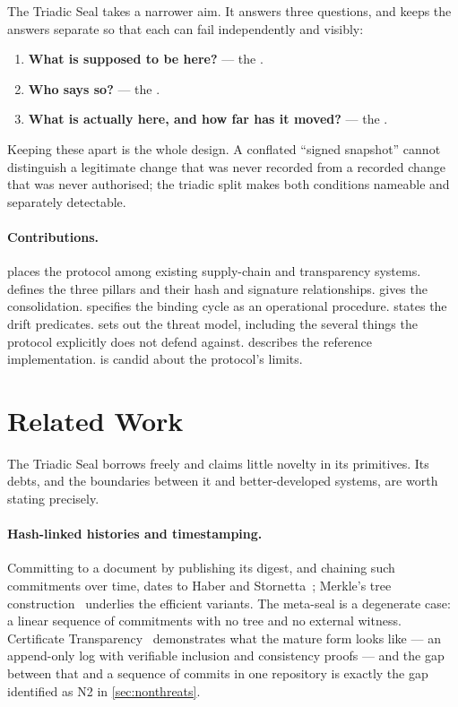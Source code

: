 \documentclass[11pt,a4paper]{article}
\begin{document}
The Triadic Seal takes a narrower aim. It answers three questions, and keeps
the answers separate so that each can fail independently and visibly:

\begin{enumerate}[label=(\roman*),leftmargin=2.2em]
  \item \textbf{What is supposed to be here?} --- the \Manifest{}.
  \item \textbf{Who says so?} --- the \Signature{}.
  \item \textbf{What is actually here, and how far has it moved?} --- the
        \Seal{}.
\end{enumerate}

Keeping these apart is the whole design. A conflated ``signed snapshot''
cannot distinguish a legitimate change that was never recorded from a
recorded change that was never authorised; the triadic split makes both
conditions nameable and separately detectable.

\paragraph{Contributions.}
 places the protocol among existing supply-chain and
transparency systems.  defines the three pillars and their
hash and signature relationships.  gives the \MetaSeal{}
consolidation.
 specifies the binding cycle as an operational procedure.
 states the drift predicates.  sets out the
threat model, including the several things the protocol explicitly does not
defend against.  describes the reference implementation.
 is candid about the protocol's limits.

\section{Related Work}
\label{sec:related}

The Triadic Seal borrows freely and claims little novelty in its primitives.
Its debts, and the boundaries between it and better-developed systems, are
worth stating precisely.

\paragraph{Hash-linked histories and timestamping.}
Committing to a document by publishing its digest, and chaining such
commitments over time, dates to Haber and Stornetta~\cite{haber1991};
Merkle's tree construction~\cite{merkle1988} underlies the efficient variants.
The meta-seal is a degenerate case: a linear sequence of commitments with no
tree and no external witness. Certificate Transparency~\cite{rfc6962}
demonstrates what the mature form looks like --- an append-only log with
verifiable inclusion and consistency proofs --- and the gap between that and a
sequence of commits in one repository is exactly the gap identified as N2 in
\cref{sec:nonthreats}.
\end{document}
